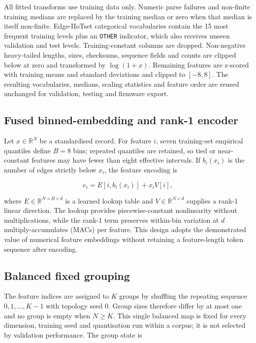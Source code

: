\documentclass[10pt,letterpaper,twocolumn]{article}
\begin{document}
All fitted transforms use training data only. Numeric parse failures and
non-finite training medians are replaced by the training median or zero when
that median is itself non-finite. Edge-IIoTset categorical vocabularies contain
the 15 most frequent training levels plus an \texttt{OTHER} indicator, which
also receives unseen validation and test levels. Training-constant columns are
dropped. Non-negative heavy-tailed lengths, sizes, checksums, sequence fields
and counts are clipped below at zero and transformed by $\log(1+x)$. Remaining
features are z-scored with training means and standard deviations and clipped
to $[-8,8]$. The resulting vocabularies, medians, scaling statistics and
feature order are reused unchanged for validation, testing and firmware export.

\subsection{Fused binned-embedding and rank-1 encoder}
\label{sec:method:encoder}

Let $x\in\mathbb{R}^{N}$ be a standardised record. For feature $i$, seven
training-set empirical quantiles define $B=8$ bins; repeated quantiles are
retained, so tied or near-constant features may have fewer than eight effective
intervals. If $b_i(x_i)$ is the number of edges strictly below $x_i$, the
feature encoding is

\begin{equation}
\label{eq:encoder}
e_i=E[i,b_i(x_i)]+x_iV[i],
\end{equation}

where $E\in\mathbb{R}^{N\times B\times d}$ is a learned lookup table and
$V\in\mathbb{R}^{N\times d}$ supplies a rank-1 linear direction. The lookup
provides piecewise-constant nonlinearity without multiplications, while the
rank-1 term preserves within-bin variation at $d$ multiply-accumulates (MACs)
per feature. This design adopts the demonstrated value of numerical feature
embeddings \cite{gorishniy2022embeddings} without retaining a feature-length
token sequence after encoding.

\subsection{Balanced fixed grouping}
\label{sec:method:grouping}

The feature indices are assigned to $K$ groups by shuffling the repeating
sequence $0,1,\ldots,K-1$ with topology seed 0. Group sizes therefore differ by
at most one and no group is empty when $N\geq K$. This single balanced map is
fixed for every dimension, training seed and quantisation run within a corpus;
it is not selected by validation performance. The group state is
\end{document}

